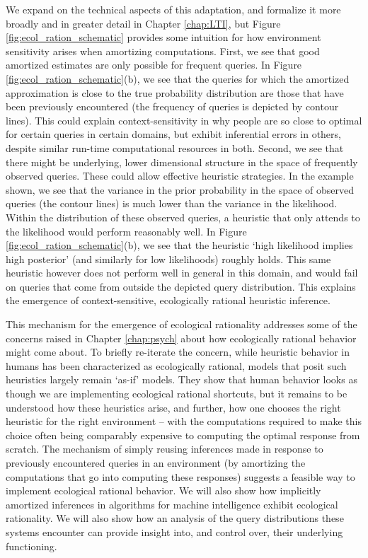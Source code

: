 We expand on the technical aspects of this adaptation, and formalize it more broadly and in greater detail in Chapter \ref{chap:LTI}, but Figure \ref{fig:ecol_ration_schematic} provides some intuition for how environment sensitivity arises when amortizing computations. First, we see that good amortized estimates are only possible for frequent queries. In Figure \ref{fig:ecol_ration_schematic}(b), we see that the queries for which the amortized approximation is close to the true probability distribution are those that have been previously encountered (the frequency of queries is depicted by contour lines). This could explain context-sensitivity in why people are so close to optimal for certain queries in certain domains, but exhibit inferential errors in others, despite similar run-time computational resources in both. Second, we see that there might be underlying, lower dimensional structure in the space of frequently observed queries. These could allow effective heuristic strategies. In the example shown, we see that the variance in the prior probability in the space of observed queries (the contour lines) is much lower than the variance in the likelihood. Within the distribution of these observed queries, a heuristic that only attends to the likelihood would perform reasonably well. In Figure \ref{fig:ecol_ration_schematic}(b), we see that the heuristic `high likelihood implies high posterior' (and similarly for low likelihoods) roughly holds. This same heuristic however does not perform well in general in this domain, and would fail on queries that come from outside the depicted query distribution. This explains the emergence of context-sensitive, ecologically rational heuristic inference.

This mechanism for the emergence of ecological rationality addresses some of the concerns raised in Chapter \ref{chap:psych} about how ecologically rational behavior might come about. To briefly re-iterate the concern, while heuristic behavior in humans has been characterized as ecologically rational\cite{gigerenzer2008heuristics}, models that posit such heuristics largely remain `as-if' models. They show that human behavior looks as though we are implementing ecological rational shortcuts, but it remains to be understood how these heuristics arise, and further, how one chooses the right heuristic for the right environment -- with the computations required to make this choice often being comparably expensive to computing the optimal response from scratch\cite{hay2014selecting, horvitz1989reflection}. The mechanism of simply reusing inferences made in response to previously encountered queries in an environment (by amortizing the computations that go into computing these responses) suggests a feasible way to implement ecological rational behavior. We will also show how implicitly amortized inferences in algorithms for machine intelligence exhibit ecological rationality. We will also show how an analysis of the query distributions these systems encounter can provide insight into, and control over, their underlying functioning.

